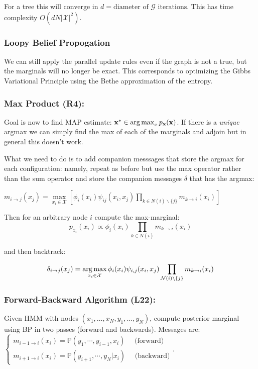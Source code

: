 \documentclass[9pt]{article}
\begin{document}
\begin{multicols}{2}
For a tree this will converge in $d=\text{diameter of } \mathcal{G} \text{ iterations}.$ This has time complexity $O(dN|\mathcal{X}|^2)$. 

\subsubsection{Loopy Belief Propogation}
We can still apply the parallel update rules even if the graph is
not a true, but the marginals will no longer be exact. This corresponds to optimizing the Gibbs Variational Principle using the Bethe approximation of the entropy.

\subsubsection{Max Product (R4):}
Goal is now to find MAP estimate: $\mathbf{x}^* \in \operatorname*{arg\,max}_{x} p_{\mathbf{x}}(\mathbf{x})$. If there is a \textit{unique} argmax
we can simply find the max of each of the marginals and adjoin but
in general this doesn't work. \newline

What we need to do is to add companion messsages that store the
argmax for each configuration: namely, repeat as before but use the max operator rather than the sum operator and store the companion
messages $\delta$ that has the argmax: 

$m_{i \rightarrow j}(x_j) = \max\limits_{x_i \in \mathcal{X}} \left[\phi_i(x_i)\psi_{ij}(x_i, x_j) \prod\limits_{k \in N(i) \backslash \{j\}} m_{k \rightarrow i}(x_i)\right]$

Then for an arbitrary node $i$ compute the max-marginal:
$$p_{x_i}(x_i) \propto \phi_i(x_i) \prod\limits_{k \in N(i)} m_{k \rightarrow i}(x_i)$$

and then backtrack: 

$$\delta_{i \to j}(x_j)=\operatorname*{arg\,max}_{x_i \in \mathcal{X}} \phi_i(x_i)\psi_{i,j}(x_i,x_j)\prod_{\mathcal{N}(i) \backslash \{j\}} m_{k \to i}(x_i)$$

\subsubsection{Forward-Backward Algorithm (L22):}
Given HMM with nodes $(x_1, \dots, x_N, y_1, \dots, y_N)$, compute 
posterior marginal using 
BP in two passes (forward and backwards). Messages are:
$\begin{cases}
m_{i-1 \to i}(x_i)=\mathbb{P}(y_1,\cdots,y_{i-1},x_i) \quad \text{ (forward)} \\
m_{i+1 \to i}(x_i) = \mathbb{P}(y_{i+1}, \cdots, y_{N}|x_i) \quad
\text { (backward)}
\end{cases}$.


\end{multicols}
\end{document}
